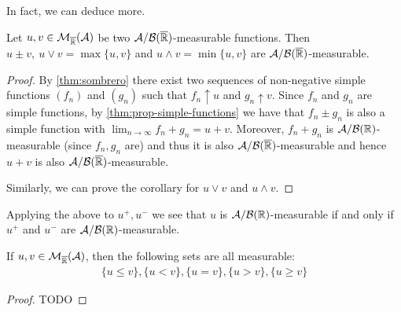 In fact, we can deduce more.

\begin{cor}
	Let $u, v \in \mathcal{M}_{\overline{\mathbb{R}}}(\mathcal{A})$ be two $\mathcal{A}/\mathcal{B}({\overline{\mathbb{R}}})$-measurable functions. Then $u \pm v,\ u \lor v = \max\{u, v\}$ and $u \land v = \min\{u, v\}$ are $\mathcal{A}/\mathcal{B}({\overline{\mathbb{R}}})$-measurable.
\end{cor}

\begin{proof}
	By \autoref{thm:sombrero} there exist two sequences of non-negative simple functions $(f_n)$ and $(g_n)$ such that $f_n \uparrow u$ and $g_n \uparrow v$. Since $f_n$ and $g_n$ are simple functions, by \autoref{thm:prop-simple-functions} we have that $f_n \pm g_n$ is also a simple function with $\lim_{n\to \infty} f_n + g_n = u + v$. Moreover, $f_n + g_n$ is $\mathcal{A}/\mathcal{B}(\mathbb{R})$-measurable (since $f_n, g_n$ are) and thus it is also $\mathcal{A}/\mathcal{B}({\overline{\mathbb{R}}})$-measurable and hence $u+v$ is also $\mathcal{A}/\mathcal{B}({\overline{\mathbb{R}}})$-measurable.
	
	Similarly, we can prove the corollary for $u\lor v$ and $u \land v$.
\end{proof}

\begin{remark}
	Applying the above to $u^+, u^-$ we see that $u$ is $\mathcal{A}/\mathcal{B}(\mathbb{R})$-measurable if and only if $u^+$ and $u^-$ are $\mathcal{A}/\mathcal{B}(\mathbb{R})$-measurable.
\end{remark}

\begin{cor}
	If $u, v \in \mathcal{M}_{\overline{\mathbb{R}}}(\mathcal{A})$, then the following sets are all measurable:
	\begin{align*}
		\{u \leq v\}, \{u < v\}, \{u = v\}, \{u > v\}, \{u \geq v\}
	\end{align*}
\end{cor}

\begin{proof}
	TODO
\end{proof}
